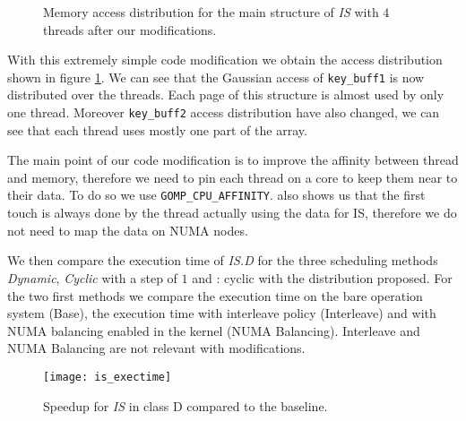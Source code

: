 \begin{figure}[htb]
    \centering


    \caption{Memory access distribution for the main structure of
        \emph{IS} with $4$ threads after our modifications.}
    \label{fig:is-behaviour-modif}
\end{figure}

With this extremely simple code modification we obtain the access distribution
shown in figure \ref{fig:is-behaviour-modif}. We can see that the Gaussian
access of \texttt{key\_buff1} is now distributed over the threads. Each page
of this structure is almost used by only one thread. Moreover
\texttt{key\_buff2} access distribution have also changed, we can see that
each thread uses mostly one part of the array.

The main point of our code modification is to improve the affinity between
thread and memory, therefore we need to pin each thread on a core to keep them
near to their data. To do so we use \texttt{GOMP\_CPU\_AFFINITY}. \TABARNAC
also shows us that the first touch is always done by the thread actually using
the data for IS, therefore we do not need to map the data on NUMA nodes.

We then compare the execution time of \emph{IS.D} for the three scheduling
methods \emph{Dynamic}, \emph{Cyclic} with a step of $1$ and \TABARNAC:
cyclic with the distribution proposed. For the two first methods we compare the
execution time on the bare operation system  (Base), the execution time with
interleave policy (Interleave) and with NUMA balancing enabled in the kernel
(NUMA Balancing). Interleave and NUMA Balancing are not relevant with
\TABARNAC modifications.

\begin{figure}[htpb]
    \centering
    \texttt{[image: is\_exectime]}
    \caption{Speedup for \emph{IS} in class D compared to the baseline.}
\label{fig:is-res}
\end{figure}

